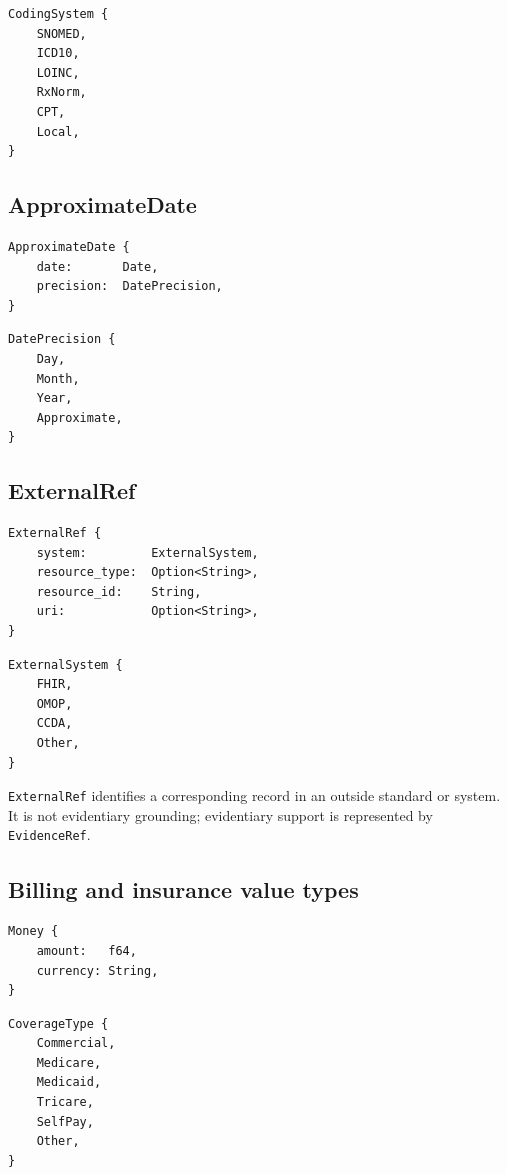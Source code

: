 \documentclass[11pt]{article}
\begin{document}
\begin{lstlisting}
CodingSystem {
    SNOMED,
    ICD10,
    LOINC,
    RxNorm,
    CPT,
    Local,
}
\end{lstlisting}

\subsection{ApproximateDate}

\begin{lstlisting}
ApproximateDate {
    date:       Date,
    precision:  DatePrecision,
}
\end{lstlisting}

\begin{lstlisting}
DatePrecision {
    Day,
    Month,
    Year,
    Approximate,
}
\end{lstlisting}

\subsection{ExternalRef}

\begin{lstlisting}
ExternalRef {
    system:         ExternalSystem,
    resource_type:  Option<String>,
    resource_id:    String,
    uri:            Option<String>,
}
\end{lstlisting}

\begin{lstlisting}
ExternalSystem {
    FHIR,
    OMOP,
    CCDA,
    Other,
}
\end{lstlisting}

\texttt{ExternalRef} identifies a corresponding record in an outside
standard or system. It is not evidentiary grounding; evidentiary support is
represented by \texttt{EvidenceRef}.

\subsection{Billing and insurance value types}

\begin{lstlisting}
Money {
    amount:   f64,
    currency: String,
}
\end{lstlisting}

\begin{lstlisting}
CoverageType {
    Commercial,
    Medicare,
    Medicaid,
    Tricare,
    SelfPay,
    Other,
}
\end{lstlisting}
\end{document}
